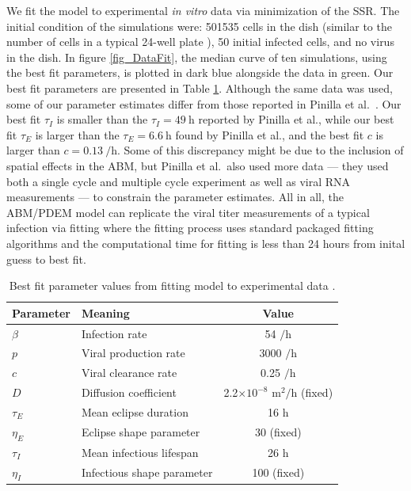 We fit the model to experimental \emph{in vitro} data \citep{pinilla12} via minimization of the SSR. The initial condition of the simulations were: 501535 cells in the dish (similar to the number of cells in a typical 24-well plate \citep{Number_of_cells_in_a_dish_noauthor_useful_nodate}), 50 initial infected cells, and no virus in the dish. In figure \ref{fig_DataFit}, the median curve of ten simulations, using the best fit parameters, is plotted in dark blue alongside the data in green. Our best fit parameters are presented in Table \ref{tab_datafit_params}. Although the same data was used, some of our parameter estimates differ from those reported in Pinilla et al.\ \citep{pinilla12}. Our best fit $\tau_I$ is smaller than the $\tau_I = \SI{49}{\hour}$ reported by Pinilla et al., while our best fit $\tau_E$ is larger than the $\tau_E = \SI{6.6}{\hour}$ found by Pinilla et al., and the best fit $c$ is larger than $c = \SI{0.13}{\per\hour}$. Some of this discrepancy might be due to the inclusion of spatial effects in the ABM, but Pinilla et al.\ also used more data --- they used both a single cycle and multiple cycle experiment as well as viral RNA measurements --- to constrain the parameter estimates. All in all, the ABM/PDEM model can replicate the viral titer measurements of a typical infection via fitting where the fitting process uses standard packaged fitting algorithms and the computational time for fitting is less than 24 hours from inital guess to best fit.

\begin{table}
\centering
\caption{Best fit parameter values from fitting model to experimental data \citep{pinilla12}. \label{tab_datafit_params}}
\begin{tabular}{llc}
\hline
Parameter & Meaning & Value \\
\hline
$\beta$ & Infection rate & 54 $/\mathrm{h}$ \\
$p$ & Viral production rate & 3000 $/\mathrm{h}$ \\
$c$ & Viral clearance rate & 0.25 $/\mathrm{h}$ \\
$D$ & Diffusion coefficient & 2.2$\times 10^{-8}$ $\mathrm{m}^2/\mathrm{h}$ (fixed) \\
$\tau_E$ & Mean eclipse duration & 16 $\mathrm{h}$ \\
$\eta_E$ & Eclipse shape parameter & 30 (fixed) \\
$\tau_I$ & Mean infectious lifespan & 26 $\mathrm{h}$ \\
$\eta_I$ & Infectious shape parameter & 100 (fixed) \\
\end{tabular}
\end{table}

